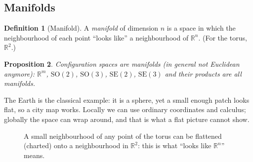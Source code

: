 \documentclass[11pt,a4paper]{article}
\newcommand{\R}{\mathbb{R}}
\newcommand{\SO}{\mathrm{SO}}
\newcommand{\SE}{\mathrm{SE}}
\theoremstyle{definition}
\newtheorem{definition}{Definition}[section]
\theoremstyle{plain}
\newtheorem{proposition}[definition]{Proposition}
\begin{document}
\subsection{Manifolds}

\begin{definition}[Manifold]
A \emph{manifold} of dimension $n$ is a space in which the neighbourhood of each point ``looks like'' a neighbourhood of $\R^n$. (For the torus, $\R^2$.)
\end{definition}

\begin{proposition}
Configuration spaces are manifolds (in general \emph{not} Euclidean anymore): $\R^m$, $\SO(2)$, $\SO(3)$, $\SE(2)$, $\SE(3)$ and their products are all manifolds.
\end{proposition}

\begin{intuition}
The Earth is the classical example: it is a sphere, yet a small enough patch looks flat, so a city map works. Locally we can use ordinary coordinates and calculus; globally the space can wrap around, and that is what a flat picture cannot show.
\end{intuition}

\begin{figure}[ht]
\centering
{}
\caption{A small neighbourhood of any point of the torus can be flattened (charted) onto a neighbourhood in $\R^2$: this is what ``looks like $\R^n$'' means.}
\end{figure}
\end{document}
